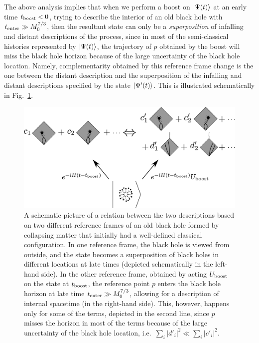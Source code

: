 \documentclass[12pt]{article}
\begin{document}
The above analysis implies that when we perform a boost on $\left| \Psi(t) \right>$ 
at an early time $t_{\rm boost} < 0$, trying to describe the interior of 
an old black hole with $t_{\rm enter} \gg M_0^{7/3}$, then the resultant 
state can only be a {\it superposition} of infalling and distant descriptions 
of the process, since in most of the semi-classical histories represented 
by $\left| \Psi(t) \right>$, the trajectory of $p$ obtained by the boost will miss 
the black hole horizon because of the large uncertainty of the black hole 
location.  Namely, complementarity obtained by this reference frame change 
is the one between the distant description and the superposition of the 
infalling and distant descriptions specified by the state $\left| \Psi'(t) \right>$. 
This is illustrated schematically in Fig.~\ref{fig:compl-1}.
%
\begin{figure}[t]
\begin{center}
  \includegraphics[width=16cm]{figure/compl-1.eps}
\caption{A schematic picture of a relation between the two descriptions 
 based on two different reference frames of an old black hole formed by 
 collapsing matter that initially had a well-defined classical configuration. 
 In one reference frame, the black hole is viewed from outside, and the 
 state becomes a superposition of black holes in different locations 
 at late times (depicted schematically in the left-hand side).  In the 
 other reference frame, obtained by acting $U_{\rm boost}$ on the state 
 at $t_{\rm boost}$, the reference point $p$ enters the black hole horizon 
 at late time $t_{\rm enter} \gg M_0^{7/3}$, allowing for a description 
 of internal spacetime (in the right-hand side).  This, however, happens 
 only for some of the terms, depicted in the second line, since $p$ misses 
 the horizon in most of the terms because of the large uncertainty of 
 the black hole location, i.e.\ $\sum_i |d'_i|^2 \ll \sum_i |c'_i|^2$.}
\label{fig:compl-1}
\end{center}
\end{figure}
%
\end{document}
